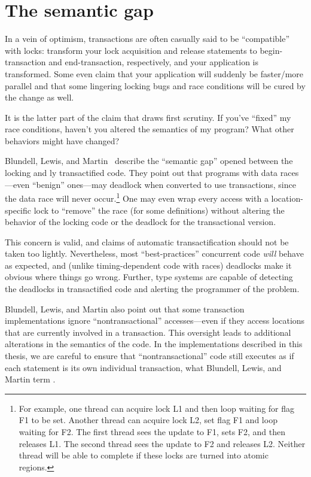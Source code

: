 \section{The semantic gap}\label{sec:semantic}
In a vein of optimism, transactions are often casually said to be
``compatible'' with locks: transform your lock acquisition and release
statements to begin-transaction and end-transaction, respectively, and
your application is transformed.  Some even claim that your
application will suddenly be faster/more parallel and that some
lingering locking bugs and race conditions will be cured by the change
as well.

It is the latter part of the claim that draws first scrutiny.  If
you've ``fixed'' my race conditions, haven't you altered the semantics
of my program?  What other behaviors might have changed?

Blundell, Lewis, and Martin~\cite{BlundellLeMa05} describe the
``semantic gap'' opened between the locking and
\naive{}ly transactified code.  They point out that programs with
data races---even ``benign'' ones---may deadlock when converted to
use transactions, since the data race will never occur.\footnote{For
  example, one thread can acquire lock L1 and then loop waiting for
  flag F1 to be set.  Another thread can acquire lock L2, set
  flag F1 and loop waiting for F2.  The first thread sees the update to
  F1, sets F2, and then releases L1.  The second thread sees the
  update to F2 and releases L2.  Neither thread will be able to
  complete if these locks are turned into atomic regions.}  One may even
wrap every access with a location-specific lock to ``remove'' the race
(for some definitions) without altering the behavior of the locking
code or the deadlock for the transactional version.

This concern is valid, and claims of automatic transactification
should not be taken too lightly.  Nevertheless, most ``best-practices''
concurrent code \emph{will} behave as expected, and (unlike
timing-dependent code with races) deadlocks make it obvious where
things go wrong.  Further, type systems are capable of detecting the
deadlocks in transactified code and alerting
the programmer of the problem.

Blundell, Lewis, and Martin also point out that some transaction
implementations ignore ``nontransactional'' accesses---even if they access
locations that are currently involved in a transaction.  This oversight
leads to additional alterations in the semantics of the code.  In the
implementations described in this thesis, we are careful to ensure
that ``nontransactional'' code still executes as if each statement
is its own individual transaction, what Blundell, Lewis, and Martin
term .

